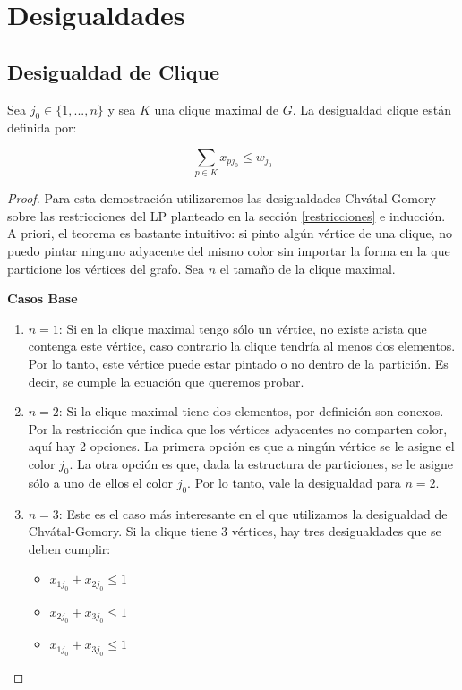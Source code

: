 \section{Desigualdades}

\subsection{Desigualdad de Clique}

Sea $j_0 \in \{1,...,n\}$ y sea $K$ una clique maximal de $G$. La desigualdad clique están definida por:

\begin{equation}
\sum_{p \in K} x_{pj_0} \leq w_{j_0}
\end{equation}

\begin{proof}
Para esta demostración utilizaremos las desigualdades Chvátal-Gomory sobre las restricciones del LP planteado en la sección \ref{restricciones} e inducción. A priori, el teorema es bastante intuitivo: si pinto algún vértice de una clique, no puedo pintar ninguno adyacente del mismo color sin importar la forma en la que particione los vértices del grafo. Sea $n$ el tamaño de la clique maximal.

\hfill

\textbf{Casos Base}
\begin{enumerate}
\item $n=1$: Si en la clique maximal tengo sólo un vértice, no existe arista que contenga este vértice, caso contrario la clique tendría al menos dos elementos. Por lo tanto, este vértice puede estar pintado o no dentro de la partición. Es decir, se cumple la ecuación que queremos probar.
\item $n=2$: Si la clique maximal tiene dos elementos, por definición son conexos. Por la restricción que indica que los vértices adyacentes no comparten color, aquí hay 2 opciones. La primera opción es que a ningún vértice se le asigne el color $j_0$. La otra opción es que, dada la estructura de particiones, se le asigne sólo a uno de ellos el color $j_0$. Por lo tanto, vale la desigualdad para $n=2$.
\item $n=3$: Este es el caso más interesante en el que utilizamos la desigualdad de Chvátal-Gomory. Si la clique tiene 3 vértices, hay tres desigualdades que se deben cumplir:

\begin{itemize}
\item $x_{1j_0} + x_{2j_0} \leq 1$
\item $x_{2j_0} + x_{3j_0} \leq 1$
\item $x_{1j_0} + x_{3j_0} \leq 1$
\end{itemize}


\end{enumerate}
\end{proof}
